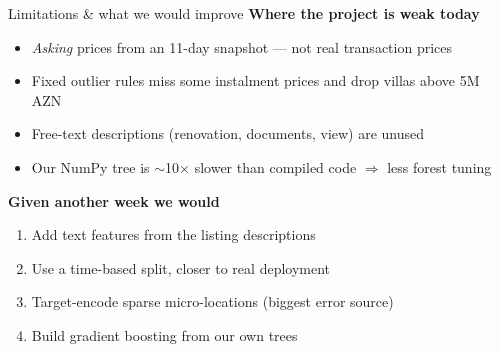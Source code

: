 \documentclass[aspectratio=169,11pt]{beamer}
\begin{document}
\begin{frame}{Limitations \& what we would improve}
  \textbf{Where the project is weak today}
  \begin{itemize}\setlength\itemsep{0.25em}
    \item \emph{Asking} prices from an 11-day snapshot --- not real transaction prices
    \item Fixed outlier rules miss some instalment prices and drop villas above 5M AZN
    \item Free-text descriptions (renovation, documents, view) are unused
    \item Our NumPy tree is $\sim$10$\times$ slower than compiled code $\Rightarrow$ less forest tuning
  \end{itemize}

  \vspace{0.3em}
  \textbf{Given another week we would}
  \begin{enumerate}\setlength\itemsep{0.25em}
    \item Add text features from the listing descriptions
    \item Use a time-based split, closer to real deployment
    \item Target-encode sparse micro-locations (biggest error source)
    \item Build gradient boosting from our own trees
  \end{enumerate}
\end{frame}
\end{document}
